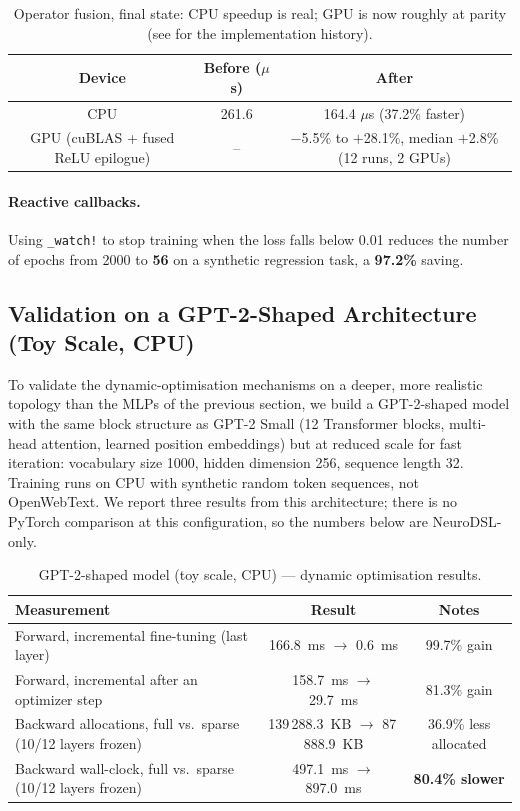 \documentclass{article}
\begin{document}
\begin{table}[H]
\centering
\caption{Operator fusion, final state: CPU speedup is real; GPU is now roughly at parity (see  for the implementation history).}
\label{tab:fusion}
\begin{tabular}{c c c}
\toprule
\textbf{Device} & \textbf{Before ($\mu$s)} & \textbf{After} \\
\midrule
CPU & 261.6 & 164.4 $\mu$s (37.2\% faster) \\
GPU (cuBLAS + fused ReLU epilogue) & -- & $-$5.5\% to $+$28.1\%, median $+$2.8\% (12 runs, 2 GPUs) \\
\bottomrule
\end{tabular}
\end{table}

\paragraph{Reactive callbacks.} Using \texttt{\_watch!} to stop training when the loss falls below 0.01 reduces the number of epochs from 2000 to \textbf{56} on a synthetic regression task, a \textbf{97.2\%} saving.


\subsection{Validation on a GPT-2-Shaped Architecture (Toy Scale, CPU)}
\label{sec:scalability}
To validate the dynamic-optimisation mechanisms on a deeper, more realistic topology than the MLPs of the previous section, we build a GPT-2-shaped model with the same block structure as GPT-2 Small (12 Transformer blocks, multi-head attention, learned position embeddings) but at reduced scale for fast iteration: vocabulary size 1000, hidden dimension 256, sequence length 32. Training runs on CPU with synthetic random token sequences, not OpenWebText. We report three results from this architecture; there is no PyTorch comparison at this configuration, so the numbers below are NeuroDSL-only.

\begin{table}[H]
\centering
\caption{GPT-2-shaped model (toy scale, CPU) — dynamic optimisation results.}
\label{tab:gpt2}
\small
\begin{tabular}{l c c}
\toprule
\textbf{Measurement} & \textbf{Result} & \textbf{Notes} \\
\midrule
Forward, incremental fine-tuning (last layer) & 166.8~ms $\to$ 0.6~ms & 99.7\% gain \\
Forward, incremental after an optimizer step & 158.7~ms $\to$ 29.7~ms & 81.3\% gain \\
\rowcolor{rowgray}
Backward allocations, full vs.\ sparse (10/12 layers frozen) & 139\,288.3~KB $\to$ 87\,888.9~KB & 36.9\% less allocated \\
Backward wall-clock, full vs.\ sparse (10/12 layers frozen) & 497.1~ms $\to$ 897.0~ms & \textbf{80.4\% slower} \\
\bottomrule
\end{tabular}
\end{table}
\end{document}
